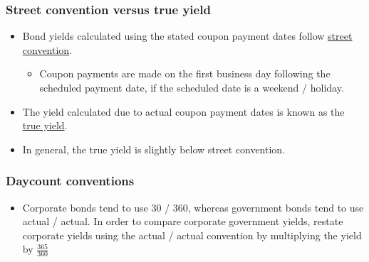 \documentclass[../notes_compiled.tex]{subfiles}
\begin{document}
\subsubsection{Street convention versus true yield}
\begin{itemize}
\item Bond yields calculated using the stated coupon payment dates follow \underline{street convention}.
\begin{itemize}
\item Coupon payments are made on the first business day following the scheduled payment date, if the scheduled date is a weekend / holiday.
\end{itemize}
\item The yield calculated due to actual coupon payment dates is known as the \underline{true yield}.
\item[] In general, the true yield is slightly below street convention.
\end{itemize}

\subsubsection{Daycount conventions}
\begin{itemize}
\item Corporate bonds tend to use 30 / 360, whereas government bonds tend to use actual / actual. In order to compare corporate government yields, restate corporate yields using the actual / actual convention by multiplying the yield by $\frac{365}{360}$
\end{itemize}
\end{document}
